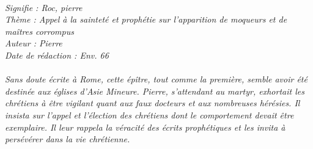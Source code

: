 \BFont
\noindent\hrulefill
{\footnotesize
\textit{
\bigskip
{\centering{}
\\Signifie : Roc, pierre
\\Thème : Appel à la sainteté et prophétie sur l'apparition de moqueurs et de maîtres corrompus
\\Auteur : Pierre
\\Date de rédaction : Env. 66\\}
}
\textit{
\\Sans doute écrite à Rome, cette épître, tout comme la première, semble avoir été destinée aux églises d’Asie Mineure. Pierre, s’attendant au martyr, exhortait les chrétiens à être vigilant quant aux faux docteurs et aux nombreuses hérésies. Il insista sur l’appel et l’élection des chrétiens dont le comportement devait être exemplaire. Il leur rappela la véracité des écrits prophétiques et les invita à persévérer dans la vie chrétienne.\bigskip
}
}
\par\nobreak\noindent\hrulefill
